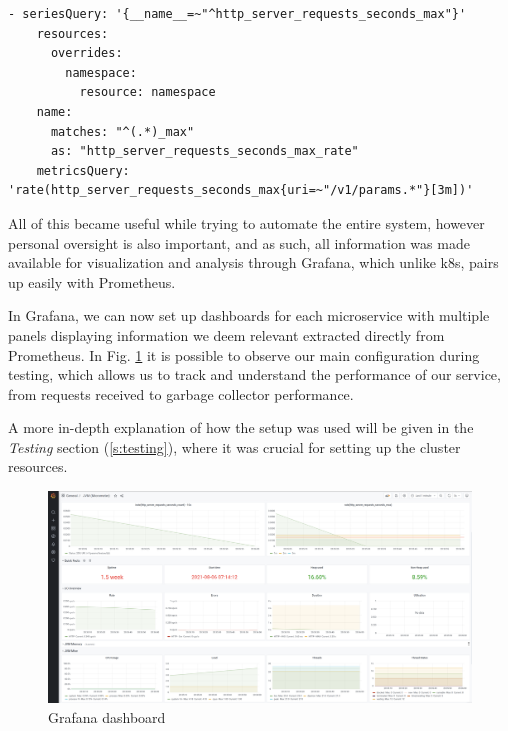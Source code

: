 \begin{lstlisting}[caption={Prometheus adapter configuration}, label={lst:prom-adapter-conf}, captionpos=b]
    - seriesQuery: '{__name__=~"^http_server_requests_seconds_max"}'
    resources:
      overrides:
        namespace:
          resource: namespace
    name:
      matches: "^(.*)_max"
      as: "http_server_requests_seconds_max_rate"
    metricsQuery: 'rate(http_server_requests_seconds_max{uri=~"/v1/params.*"}[3m])'
\end{lstlisting}

All of this became useful while trying to automate the entire system, however personal oversight is also important, and as such, all information was made available for visualization and analysis through Grafana, which unlike \acrshort{k8s}, pairs up easily with Prometheus.

In Grafana, we can now set up dashboards for each microservice with multiple panels displaying information we deem relevant extracted directly from Prometheus. In Fig. \ref{fig:grafana-dashboard} it is possible to observe our main configuration during testing, which allows us to track and understand the performance of our service, from requests received to garbage collector performance. 

A more in-depth explanation of how the setup was used will be given in the \textit{Testing} section (\ref{s:testing}), where it was crucial for setting up the cluster resources. 

\begin{figure}[h]
    \centering
    \includegraphics[width=1\textwidth,clip,trim=0 0 0 0]{Chapters/img/backend/grafana-dashboard.png}
    \caption{Grafana dashboard} 
    \label{fig:grafana-dashboard}
\end{figure}

